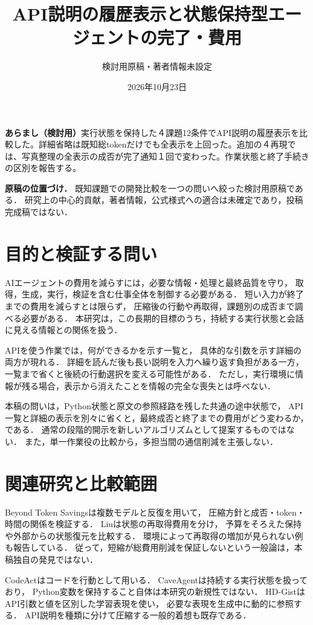 \documentclass[uplatex,a4paper,twocolumn,10pt]{jsarticle}
\title{API説明の履歴表示と\newline 状態保持型エージェントの完了・費用}
\author{検討用原稿・著者情報未設定}
\date{2026年10月23日}
\begin{document}
\raggedbottom
\maketitle
\noindent\textbf{あらまし（検討用）}\quad 実行状態を保持した４課題12条件でAPI説明の履歴表示を比較した。詳細省略は既知総tokenだけでも全表示を上回った。追加の４再現では、写真整理の全表示の成否が完了通知１回で変わった。作業状態と終了手続きの区別を報告する。
\par\medskip
\noindent\textbf{原稿の位置づけ．}
既知課題での開発比較を一つの問いへ絞った検討用原稿である．
研究上の中心的貢献，著者情報，公式様式への適合は未確定であり，投稿完成稿ではない．

\section{目的と検証する問い}
AIエージェントの費用を減らすには，必要な情報・処理と最終品質を守り，
取得，生成，実行，検証を含む仕事全体を制御する必要がある．
短い入力が終了までの費用を減らすとは限らず，
圧縮後の行動や再取得，課題別の成否まで調べる必要がある\cite{beyond}．
本研究は，この長期的目標のうち，持続する実行状態と会話に見える情報との関係を扱う．

APIを使う作業では，何ができるかを示す一覧と，
具体的な引数を示す詳細の両方が現れる．
詳細を読んだ後も長い説明を入力へ繰り返す負担がある一方，
一覧まで省くと後続の行動選択を変える可能性がある．
ただし，実行環境に情報が残る場合，表示から消えたことを情報の完全な喪失とは呼べない．

本稿の問いは，Python状態と原文の参照経路を残した共通の途中状態で，
API一覧と詳細の表示を別々に省くと，最終成否と終了までの費用がどう変わるか，である．
通常の段階的開示を新しいアルゴリズムとして提案するものではない．
また，単一作業役の比較から，多担当間の通信削減を主張しない．

\section{関連研究と比較範囲}
Beyond Token Savings\cite{beyond}は複数モデルと反復を用いて，
圧縮方針と成否・token・時間の関係を検証する．
Liu\cite{interaction}は状態の再取得費用を分け，
予算をそろえた保持や外部からの状態復元を比較する．
環境によって再取得の増加が見られない例も報告している．
従って，短縮が総費用削減を保証しないという一般論は，本稿独自の発見ではない．

CodeAct\cite{codeact}はコードを行動として用いる．
CaveAgent\cite{cave}は持続する実行状態を扱っており，
Python変数を保持すること自体は本研究の新規性ではない．
HD-Gist\cite{hdgist}はAPI引数と値を区別した学習表現を使い，
必要な表現を生成中に動的に参照する．
API説明を種類に分けて圧縮する一般的着想も既存である．
\end{document}
